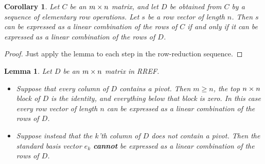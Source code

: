 \documentclass[reqno]{amsart}
\newtheorem{lemma}[theorem]{Lemma}
\newtheorem{corollary}[theorem]{Corollary}
\theoremstyle{definition}
\begin{document}
\begin{corollary}\label{cor-span-invariant}
 Let $C$ be an $m\times n$ matrix, and let $D$ be obtained from $C$ by a
 sequence of elementary row operations.  Let $s$ be a row vector of length
 $n$.  Then $s$ can be expressed as a linear combination of the rows
 of $C$ if and only if it can be expressed as a linear combination of
 the rows of $D$.
\end{corollary}
\begin{proof}
 Just apply the lemma to each step in the row-reduction sequence.
\end{proof}

\begin{lemma}\label{lem-check-span-RREF}
 Let $D$ be an $m\times n$ matrix in RREF.
 \begin{itemize}
  \item[(a)] Suppose that every column of $D$ contains a pivot.  Then
   $m\geq n$, the top $n\times n$ block of $D$ is the identity,  and
   everything below that block is zero.  In this case every row vector
   of length $n$ can be expressed as a linear combination of the rows
   of $D$.
  \item[(b)] Suppose instead that the $k$'th column of $D$ does not contain
   a pivot.  Then the standard basis vector $e_k$ \textbf{cannot} be
   expressed as a linear combination of the rows of $D$.
 \end{itemize}
\end{lemma}
\end{document}
